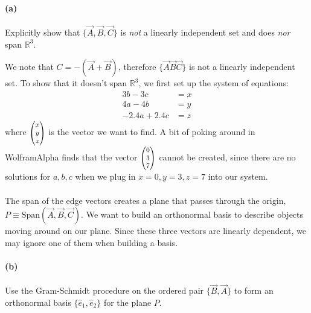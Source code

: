 \documentclass{article}
\begin{document}
\paragraph{(a)}
Explicitly show that $\{\vec{A}, \vec{B}, \vec{C}\}$ is \emph{not} a linearly independent set and does \emph{nor} span $\mathbb{R}^{3}$.

\begin{solution}
    We note that $C = -(\vec A + \vec B)$, therefore $\{\vec A \vec B \vec C\}$ is not a linearly independent set. To show that it doesn't span $\mathbb R^3$, we first set up the system of equations:
    \begin{align}
        3b -3c &= x\\
        4a - 4b &= y\\
        -2.4a + 2.4c &= z
    \end{align}
    where $\smthreevect{x}{y}{z}$ is the vector we want to find. A bit of poking around in WolframAlpha finds that the vector $\smthreevect{0}{3}{7}$ cannot be created, since there are no solutions for $a, b, c$ when we plug in $x = 0, y = 3, z = 7$ into our system.
\end{solution}


\phline
\paragraph{}
The span of the edge vectors creates a plane that passes through the origin, $P \equiv \textrm{Span}(\vec{A},\vec{B},\vec{C})$.  
We want to build an orthonormal basis to describe objects moving around on our plane.
Since these three vectors are linearly dependent, we may ignore one of them when building a basis. 

\paragraph{(b)}
Use the Gram-Schmidt procedure on the ordered pair $\{\vec{B},\vec{A}\}$ to form an orthonormal basis $\{\hat{e}_{1},\hat{e}_{2}\}$ for the plane $P$.\\
\end{document}

